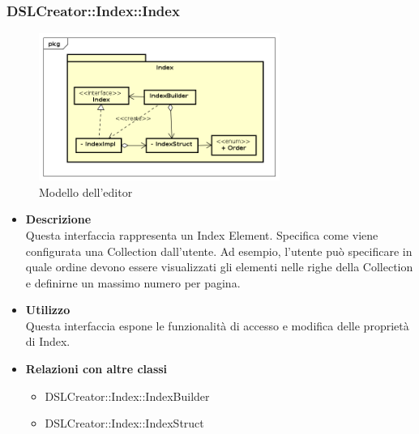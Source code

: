  \subsubsection{DSLCreator::Index::Index}
                \begin{figure}[H]
                  \centering
                  \includegraphics[width=0.7\textwidth]{res/img/Index.png}
                  \caption{Modello dell'editor}
                  \label{fig:diagram_model}
                \end{figure}
                    \begin{itemize}
                        \item \textbf{Descrizione} \hfill \\
                            Questa interfaccia rappresenta un Index Element. Specifica come viene configurata una Collection dall'utente. Ad esempio, l'utente può specificare in quale ordine devono essere visualizzati gli elementi nelle righe della Collection e definirne un massimo numero per pagina.
                        \item \textbf{Utilizzo} \hfill \\
                            Questa interfaccia espone le funzionalità di accesso e modifica delle proprietà di Index.
                        \item \textbf{Relazioni con altre classi}
                            \begin{itemize}
                              \item DSLCreator::Index::IndexBuilder
                              \item DSLCreator::Index::IndexStruct
                            \end{itemize}
                    \end{itemize}

